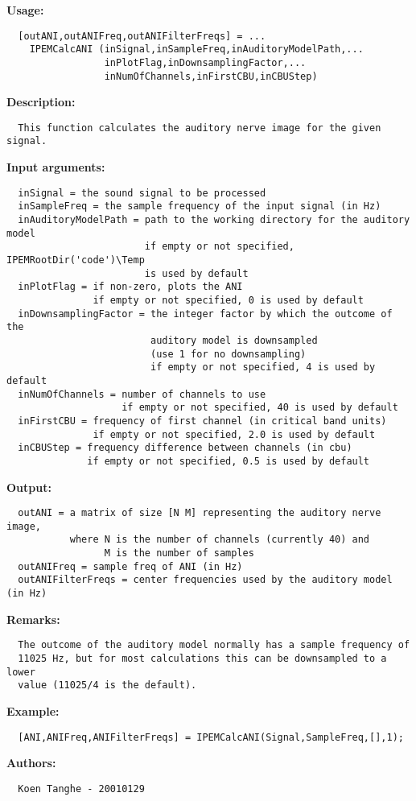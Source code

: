 \textbf{Usage:}
\begin{verbatim}  [outANI,outANIFreq,outANIFilterFreqs] = ...
    IPEMCalcANI (inSignal,inSampleFreq,inAuditoryModelPath,...
                 inPlotFlag,inDownsamplingFactor,...
                 inNumOfChannels,inFirstCBU,inCBUStep)

\end{verbatim}
\textbf{Description:}
\begin{verbatim}  This function calculates the auditory nerve image for the given signal.

\end{verbatim}
\textbf{Input arguments:}
\begin{verbatim}  inSignal = the sound signal to be processed
  inSampleFreq = the sample frequency of the input signal (in Hz)
  inAuditoryModelPath = path to the working directory for the auditory model
                        if empty or not specified, IPEMRootDir('code')\Temp
                        is used by default
  inPlotFlag = if non-zero, plots the ANI
               if empty or not specified, 0 is used by default
  inDownsamplingFactor = the integer factor by which the outcome of the
                         auditory model is downsampled
                         (use 1 for no downsampling)
                         if empty or not specified, 4 is used by default
  inNumOfChannels = number of channels to use
                    if empty or not specified, 40 is used by default
  inFirstCBU = frequency of first channel (in critical band units)
               if empty or not specified, 2.0 is used by default
  inCBUStep = frequency difference between channels (in cbu)
              if empty or not specified, 0.5 is used by default

\end{verbatim}
\textbf{Output:}
\begin{verbatim}  outANI = a matrix of size [N M] representing the auditory nerve image,
           where N is the number of channels (currently 40) and
                 M is the number of samples
  outANIFreq = sample freq of ANI (in Hz)
  outANIFilterFreqs = center frequencies used by the auditory model (in Hz)

\end{verbatim}
\textbf{Remarks:}
\begin{verbatim}  The outcome of the auditory model normally has a sample frequency of
  11025 Hz, but for most calculations this can be downsampled to a lower
  value (11025/4 is the default).

\end{verbatim}
\textbf{Example:}
\begin{verbatim}  [ANI,ANIFreq,ANIFilterFreqs] = IPEMCalcANI(Signal,SampleFreq,[],1);

\end{verbatim}
\textbf{Authors:}
\begin{verbatim}  Koen Tanghe - 20010129
\end{verbatim}


